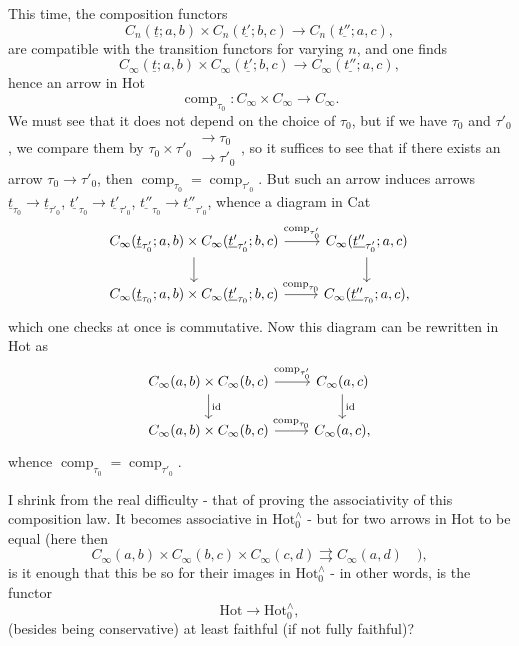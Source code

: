 \documentclass[11pt]{article}
\newcommand{\printedpage}[1]{\marginpar{\footnotesize p.~#1}}
\newcommand{\msp}[1]{\marginpar{\footnotesize [#1]}}
\newcommand{\comp}{\operatorname{comp}}
\newcommand{\Hot}{\mathrm{Hot}}
\begin{document}
\printedpage{79}

This time, the composition functors
\[ C_n(\underline{t};a,b)\times C_n(\underline{t'};b,c) \longrightarrow C_n(\underline{t''};a,c), \]
are compatible with the transition functors for varying $n$, and one finds
\msp{page 126}
\[ C_\infty(\underline{t};a,b)\times C_\infty(\underline{t'};b,c) \longrightarrow C_\infty(\underline{t''};a,c), \]
hence an arrow in Hot
\[ \comp_{\tau_0} : C_\infty\times C_\infty \longrightarrow C_\infty. \]
We must see that it does not depend on the choice of $\tau_0$, but if we have $\tau_0$ and $\tau'_0$, we compare them by $\tau_0\times\tau'_0 \begin{array}{l}\longrightarrow \tau_0\\ \longrightarrow \tau'_0\end{array}$, so it suffices to see that if there exists an arrow $\tau_0\longrightarrow\tau'_0$, then $\comp_{\tau_0} = \comp_{\tau'_0}$. But such an arrow induces arrows $\underline{t}_{\tau_0}\longrightarrow\underline{t}_{\tau'_0}$, $\underline{t'}_{\tau_0}\longrightarrow\underline{t'}_{\tau'_0}$, $\underline{t''}_{\tau_0}\longrightarrow\underline{t''}_{\tau'_0}$, whence a diagram in Cat
\[
\begin{tikzcd}
C_\infty(\underline{t}_{\tau'_0};a,b)\times C_\infty(\underline{t'}_{\tau'_0};b,c) \arrow[r, "{\comp_{\tau'_0}}"] \arrow[d] & C_\infty(\underline{t''}_{\tau'_0};a,c) \arrow[d] \\
C_\infty(\underline{t}_{\tau_0};a,b)\times C_\infty(\underline{t'}_{\tau_0};b,c) \arrow[r, "{\comp_{\tau_0}}"] & C_\infty(\underline{t''}_{\tau_0};a,c),
\end{tikzcd}
\]
which one checks at once is commutative. Now this diagram can be rewritten in Hot as
\[
\begin{tikzcd}
C_\infty(a,b)\times C_\infty(b,c) \arrow[r, "{\comp_{\tau'_0}}"] \arrow[d, "{\mathrm{id}}"] & C_\infty(a,c) \arrow[d, "{\mathrm{id}}"] \\
C_\infty(a,b)\times C_\infty(b,c) \arrow[r, "{\comp_{\tau_0}}"] & C_\infty(a,c),
\end{tikzcd}
\]
\msp{page 127}
whence $\comp_{\tau_0} = \comp_{\tau'_0}$.

I shrink from the real difficulty - that of proving the associativity of this composition law. It becomes associative in $\Hot^{\wedge}_{0}$ - but for two arrows in Hot to be equal (here then
\[ C_\infty(a,b)\times C_\infty(b,c)\times C_\infty(c,d) \rightrightarrows C_\infty(a,d)\quad ), \]
is it enough that this be so for their images in $\Hot^{\wedge}_{0}$ - in other words, is the functor
\[ \Hot\longrightarrow\Hot^{\wedge}_{0}, \]
(besides being conservative) at least faithful (if not fully faithful)?
\end{document}
